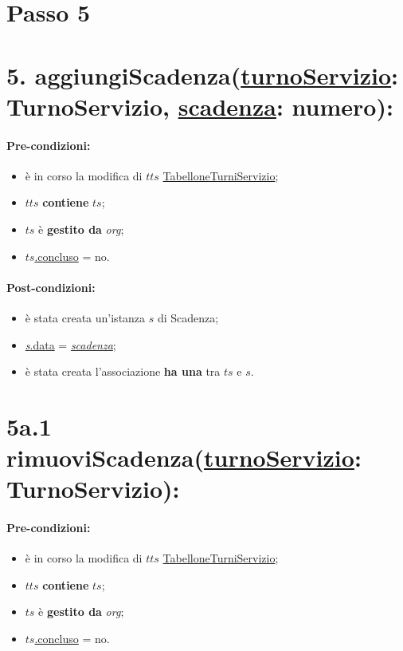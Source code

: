 \section{Passo 5}
\section*{5. aggiungiScadenza(\underline{turnoServizio}: TurnoServizio, \underline{scadenza}: numero):}

\paragraph{Pre-condizioni:}
\begin{itemize}
 \item è in corso la modifica di $tts$ \underline{TabelloneTurniServizio};
    \item $tts$ \textbf{contiene} $ts$;
     \item $ts$ è \textbf{gestito da} {\textit{org}};
   \item \underline{$ts$.concluso} = no.
\end{itemize}

\paragraph{Post-condizioni:}  
\begin{itemize}
 \item è stata creata un'istanza $s$ di Scadenza;
 \item \underline{\textit{s}.data} = \underline{\textit{scadenza}};
 \item è stata creata l'associazione \textbf{ha una} tra $ts$ e $s$.
\end{itemize}

\section*{5a.1 rimuoviScadenza(\underline{turnoServizio}: TurnoServizio):}

\paragraph{Pre-condizioni:}
\begin{itemize}
 \item è in corso la modifica di $tts$ \underline{TabelloneTurniServizio};
    \item $tts$ \textbf{contiene} $ts$;
     \item $ts$ è \textbf{gestito da} {\textit{org}};
   \item \underline{$ts$.concluso} = no.
\end{itemize}

